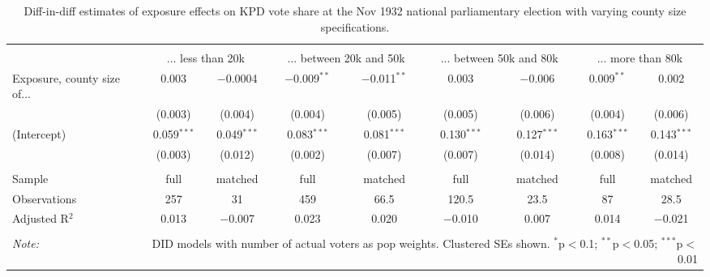 
\begin{table}[!htbp] \centering 
  \caption{Diff-in-diff estimates of exposure effects on KPD vote share at the Nov 1932 national parliamentary election with varying county size specifications.\vspace{-.25cm}} 
  \label{tab:nsdap-voteshare-kpd-countysize-dd-1932-2} 
\scriptsize 
\begin{tabular}{@{\extracolsep{5pt}}lcccccccc} 
\\[-1.8ex]\hline 
\hline \\[-1.8ex] 
 & \multicolumn{2}{c}{... less than 20k } & \multicolumn{2}{c}{... between 20k and 50k} & \multicolumn{2}{c}{... between 50k and 80k} & \multicolumn{2}{c}{... more than 80k} \\ 
 \cmidrule(r){2-3}\cmidrule(r){4-5}\cmidrule(r){6-7}\cmidrule(r){8-9}Exposure, county size of... & 0.003 & $-$0.0004 & $-$0.009$^{**}$ & $-$0.011$^{**}$ & 0.003 & $-$0.006 & 0.009$^{**}$ & 0.002 \\ 
  & (0.003) & (0.004) & (0.004) & (0.005) & (0.005) & (0.006) & (0.004) & (0.006) \\ 
  (Intercept) & 0.059$^{***}$ & 0.049$^{***}$ & 0.083$^{***}$ & 0.081$^{***}$ & 0.130$^{***}$ & 0.127$^{***}$ & 0.163$^{***}$ & 0.143$^{***}$ \\ 
  & (0.003) & (0.012) & (0.002) & (0.007) & (0.007) & (0.014) & (0.008) & (0.014) \\ 
 \hline \\[-1.8ex] 
Sample & full & matched & full & matched & full & matched & full & matched \\ 
Observations & 257 & 31 & 459 & 66.5 & 120.5 & 23.5 & 87 & 28.5 \\ 
Adjusted R$^{2}$ & 0.013 & $-$0.007 & 0.023 & 0.020 & $-$0.010 & 0.007 & 0.014 & $-$0.021 \\ 
\hline 
\hline \\[-1.8ex] 
\textit{Note:}  & \multicolumn{8}{r}{DID models with number of actual voters as pop weights. Clustered SEs shown. $^{*}$p$<$0.1; $^{**}$p$<$0.05; $^{***}$p$<$0.01} \\ 
\end{tabular} 
\end{table} 
